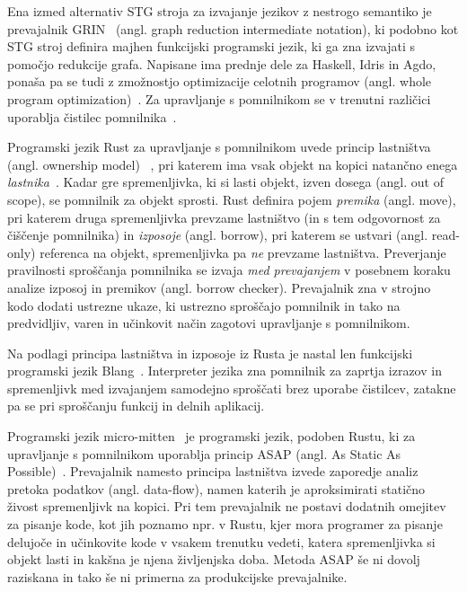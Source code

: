 Ena izmed alternativ STG stroja za izvajanje jezikov z nestrogo semantiko je  prevajalnik GRIN~\cite{boquist1997grin} (angl. graph reduction intermediate notation), ki podobno kot STG stroj definira majhen funkcijski programski jezik, ki ga zna izvajati s pomočjo redukcije grafa. Napisane ima prednje dele za Haskell, Idris in Agdo, ponaša pa se tudi z zmožnostjo optimizacije celotnih programov (angl. whole program optimization)~\cite{podlovics2022modern}. Za upravljanje s pomnilnikom se v trenutni različici uporablja čistilec pomnilnika~\cite{boquist1999code}.

Programski jezik Rust za upravljanje s pomnilnikom uvede princip lastništva (angl. ownership model) ~\cite{klabnik2023rust}, pri katerem ima vsak objekt na kopici natančno enega \textit{lastnika}~\cite{Jung, Oxide, StackedBorrows}. Kadar gre spremenljivka, ki si lasti objekt, izven dosega (angl. out of scope), se pomnilnik za objekt sprosti. Rust definira pojem \textit{premika} (angl. move), pri katerem druga spremenljivka prevzame lastništvo (in s tem odgovornost za čiščenje pomnilnika) in \textit{izposoje} (angl. borrow), pri katerem se ustvari (angl. read-only) referenca na objekt, spremenljivka pa \textit{ne} prevzame lastništva. Preverjanje pravilnosti sproščanja pomnilnika se izvaja \textit{med prevajanjem} v posebnem koraku analize izposoj in premikov (angl. borrow checker). Prevajalnik zna v strojno kodo dodati ustrezne ukaze, ki ustrezno sproščajo pomnilnik in tako na predvidljiv, varen in učinkovit način zagotovi upravljanje s pomnilnikom.

Na podlagi principa lastništva in izposoje iz Rusta je nastal len funkcijski programski jezik Blang~\cite{Kocjan_Turk_2022}. Interpreter jezika zna pomnilnik za zaprtja izrazov in spremenljivk med izvajanjem samodejno sproščati brez uporabe čistilcev, zatakne pa se pri sproščanju funkcij in delnih aplikacij.

Programski jezik micro-mitten~\cite{corbyn:practical-static-memory-management} je programski jezik, podoben Rustu, ki za upravljanje s pomnilnikom uporablja princip ASAP (angl. As Static As Possible)~\cite{proust2017asap}. Prevajalnik namesto principa lastništva izvede zaporedje analiz pretoka podatkov (angl. data-flow), namen katerih je aproksimirati statično živost spremenljivk na kopici. Pri tem prevajalnik ne postavi dodatnih omejitev za pisanje kode, kot jih poznamo npr. v Rustu, kjer mora programer za pisanje delujoče in učinkovite kode v vsakem trenutku vedeti, katera spremenljivka si objekt lasti in kakšna je njena življenjska doba. Metoda ASAP še ni dovolj raziskana in tako še ni primerna za produkcijske prevajalnike.